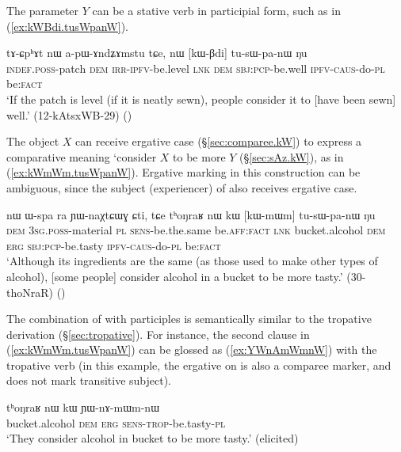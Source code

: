 The parameter $Y$ can be a stative verb in participial form, such as  in (\ref{ex:kWBdi.tusWpanW}).

\begin{exe}
\ex \label{ex:kWBdi.tusWpanW}
\gll tɤ-ɕpʰɤt nɯ a-pɯ-ɤndʑɤmstu tɕe, nɯ [kɯ-βdi] tu-sɯ-pa-nɯ ŋu \\
\textsc{indef}.\textsc{poss}-patch \textsc{dem} \textsc{irr}-\textsc{ipfv}-be.level \textsc{lnk} \textsc{dem} \textsc{sbj}:\textsc{pcp}-be.well \textsc{ipfv}-\textsc{caus}-do-\textsc{pl} be:\textsc{fact} \\
\glt `If the patch is level (if it is neatly sewn), people consider it to [have been sewn] well.' (12-kAtsxWB-29)
()
\end{exe}


The object $X$ can receive ergative case (§\ref{sec:comparee.kW}) to express a comparative meaning `consider $X$ to be more $Y$ (§\ref{sec:sAz.kW}), as in (\ref{ex:kWmWm.tusWpanW}). Ergative marking in this construction can be ambiguous, since the subject (experiencer) of  also receives ergative case.

\begin{exe}
\ex \label{ex:kWmWm.tusWpanW}
\gll nɯ ɯ-spa ra ɲɯ-naχtɕɯɣ ɕti, tɕe tʰoŋraʁ nɯ kɯ [kɯ-mɯm] tu-sɯ-pa-nɯ ŋu \\
\textsc{dem} \textsc{3sg}.\textsc{poss}-material \textsc{pl} \textsc{sens}-be.the.same be.\textsc{aff}:\textsc{fact} \textsc{lnk} bucket.alcohol \textsc{dem} \textsc{erg} \textsc{sbj}:\textsc{pcp}-be.tasty \textsc{ipfv}-\textsc{caus}-do-\textsc{pl} be:\textsc{fact} \\
\glt `Although its ingredients are the same (as those used to make other types of alcohol), [some people] consider alcohol in a bucket to be more tasty.' (30-thoNraR)
()
\end{exe}

The combination of  with participles is semantically similar to the tropative  derivation (§\ref{sec:tropative}). For instance, the second clause in (\ref{ex:kWmWm.tusWpanW}) can be glossed as (\ref{ex:YWnAmWmnW}) with the tropative verb  (in this example, the ergative on  is also a comparee marker, and does not mark transitive subject).

\begin{exe}
\ex \label{ex:YWnAmWmnW}
\gll tʰoŋraʁ nɯ kɯ ɲɯ-nɤ-mɯm-nɯ \\
bucket.alcohol \textsc{dem} \textsc{erg} \textsc{sens}-\textsc{trop}-be.tasty-\textsc{pl} \\
\glt `They consider alcohol in bucket to be more tasty.' (elicited)
\end{exe}


